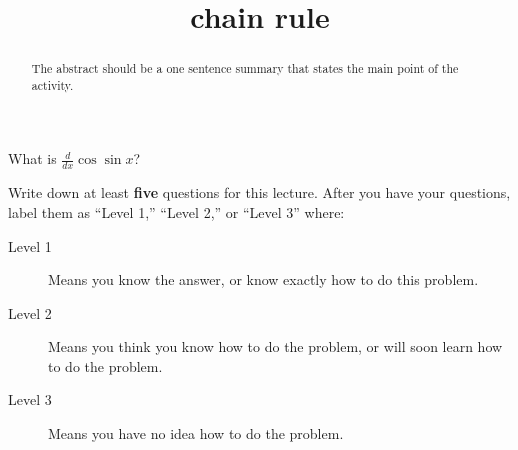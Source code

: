 \documentclass{ximera}
\title{chain rule}
\begin{document}
\begin{abstract}
  The abstract should be a one sentence summary that states the main point of the activity.
\end{abstract}

\maketitle

\begin{question}
  What is $\frac{d}{dx} \cos \sin x$?

  
    \begin{multipleChoice}
    \end{multipleChoice}  
  
\end{question}

Write down at least \textbf{five} questions for this lecture. After
you have your questions, label them as ``Level 1,'' ``Level 2,'' or ``Level 3'' where:
\begin{description}
\item[Level 1] Means you know the answer, or know exactly how to do this problem.
\item[Level 2] Means you think you know how to do the problem, or will soon learn how to do the problem.
\item[Level 3] Means you have no idea how to do the problem. 
\end{description}
\begin{question}
  \begin{freeResponse}
  \end{freeResponse}
\end{question}
\end{document}
